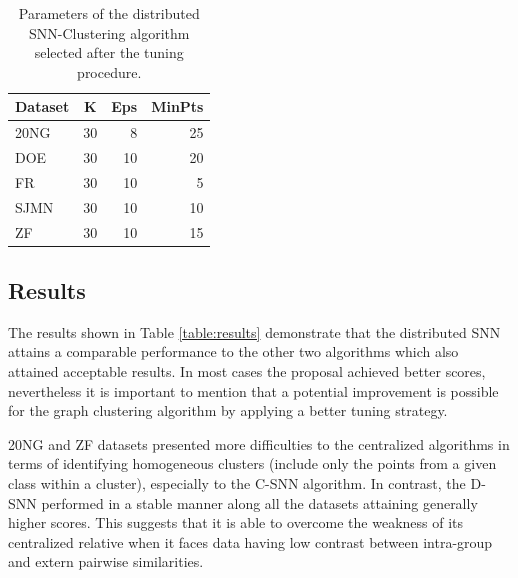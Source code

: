 \documentclass[a4paper]{article}
\begin{document}
\begin{table}[!htbp]
\centering
\begin{tabular}{l|crr}
\textbf{Dataset} & \textbf{K} & \textbf{Eps} & \textbf{MinPts} \\ \hline
20NG    & 30& 8 & 25 \\
DOE     & 30& 10& 20 \\
FR      & 30& 10& 5  \\
SJMN    & 30& 10& 10 \\
ZF      & 30& 10& 15 \\ \hline
\end{tabular}
\caption{Parameters of the distributed SNN-Clustering algorithm selected after the tuning procedure.}
\label{table:distributedsnn_params}
\end{table}


\subsection*{Results}
The results shown in Table \ref{table:results} demonstrate that the distributed SNN attains a comparable performance to the other two algorithms which also attained acceptable results. In most cases the proposal achieved better scores, nevertheless it is important to mention that a potential improvement is possible for the graph clustering algorithm by applying a better tuning strategy. 


%

20NG and ZF datasets presented more difficulties to the centralized algorithms in terms of identifying homogeneous clusters (include only the points from a given class within a cluster), especially to the C-SNN algorithm. In contrast, the D-SNN performed in a stable manner along all the datasets attaining generally higher scores. This suggests that it is able to  overcome the weakness of its centralized relative when it faces data having low contrast between intra-group and extern pairwise similarities. 


\end{document}
